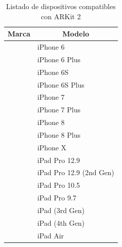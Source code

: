 \begin{table}[h]
	\begin{tabular}{| p{4.5cm} | p{10.5cm} |}
		\hline \centering
		\textbf{Marca}              & \multicolumn{1}{c|}{\textbf{Modelo}}               \\ \hline \centering
		\multirow{16}{*}{Apple}       & iPhone 6     \\ \cline{2-2}  
		& iPhone 6 Plus                                 \\ \cline{2-2}
		& iPhone 6S                                     \\ \cline{2-2}
		& iPhone 6S Plus                                \\ \cline{2-2}
		& iPhone 7                                      \\ \cline{2-2}
		& iPhone 7 Plus                                 \\ \cline{2-2}
		& iPhone 8                                      \\ \cline{2-2}
		& iPhone 8 Plus                                 \\ \cline{2-2}
		& iPhone X                                      \\ \cline{2-2}
		& iPad Pro 12.9                                 \\ \cline{2-2}
		& iPad Pro 12.9 (2nd Gen)                       \\ \cline{2-2}
		& iPad Pro 10.5                                 \\ \cline{2-2}
		& iPad Pro 9.7                                  \\ \cline{2-2}
		& iPad (3rd Gen)	                              \\ \cline{2-2}
		& iPad (4th Gen)	                              \\ \cline{2-2}
		& iPad Air                                      \\ \cline{2-2}
		\hline 
	\end{tabular}
	\captionsetup{justification=centering}
	\caption{Listado de dispositivos compatibles con ARKit 2}
\end{table}
\noindent
